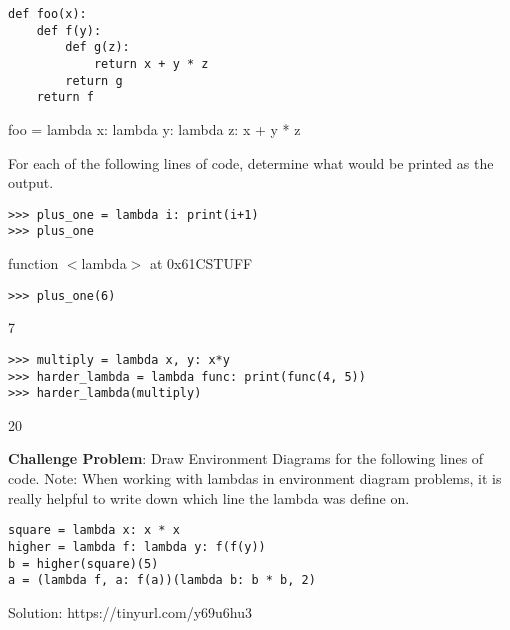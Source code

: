 \begin{lstlisting}
def foo(x):
    def f(y):
        def g(z):
            return x + y * z
        return g
    return f
\end{lstlisting}
\begin{solution}[0.25in]
foo = lambda x: lambda y: lambda z: x + y * z
\end{solution}
\newpage

\question 
For each of the following lines of code, determine what would be printed as the output. \newline
\begin{lstlisting}
>>> plus_one = lambda i: print(i+1)
>>> plus_one
\end{lstlisting}
\begin{solution}[0.25in]
function $<$lambda$>$ at 0x61CSTUFF
\end{solution}
\begin{lstlisting}
>>> plus_one(6)
\end{lstlisting}
\begin{solution}[0.25in]
7
\end{solution}
\begin{lstlisting}
>>> multiply = lambda x, y: x*y
>>> harder_lambda = lambda func: print(func(4, 5))
>>> harder_lambda(multiply)
\end{lstlisting}
\begin{solution}[0.25in]
20
\end{solution}


\question 
\textbf{Challenge Problem}: 
Draw Environment Diagrams for the following lines of code. 
\newline
Note: When working with lambdas in environment diagram problems, it is really helpful to write down  which line the lambda was define on.
\begin{lstlisting}
square = lambda x: x * x
higher = lambda f: lambda y: f(f(y))
b = higher(square)(5)
a = (lambda f, a: f(a))(lambda b: b * b, 2)
\end{lstlisting}
\begin{solution}
Solution: https://tinyurl.com/y69u6hu3
\end{solution}
